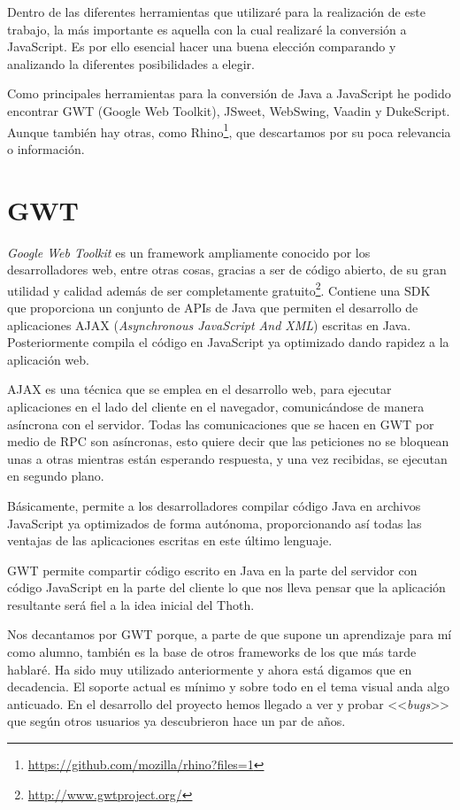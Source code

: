 
Dentro de las diferentes herramientas que utilizaré para la realización de este trabajo, la más importante es aquella con la cual realizaré la conversión a JavaScript. Es por ello esencial hacer una buena elección comparando y analizando la diferentes posibilidades a elegir.

Como principales herramientas para la conversión de Java a JavaScript he podido encontrar GWT (Google Web Toolkit), JSweet, WebSwing, Vaadin y DukeScript. Aunque también hay otras, como Rhino\footnote{\url{https://github.com/mozilla/rhino?files=1}}, que descartamos por su poca relevancia o información.

\section{GWT}

\emph{Google Web Toolkit} es un framework ampliamente conocido por los desarrolladores web, entre otras cosas, gracias a ser de código abierto, de su gran utilidad y calidad además de ser completamente gratuito\footnote{\url{http://www.gwtproject.org/}}.
Contiene una SDK que proporciona un conjunto de APIs de Java que permiten el desarrollo de aplicaciones AJAX (\emph{Asynchronous JavaScript And XML}) escritas en Java. Posteriormente compila el código en JavaScript ya optimizado dando rapidez a la aplicación web. 

AJAX es una técnica que se emplea en el desarrollo web, para ejecutar aplicaciones en el lado del cliente en el navegador, comunicándose de manera asíncrona con el servidor. Todas las comunicaciones que se hacen en GWT por medio de RPC son asíncronas, esto quiere decir que las peticiones no se bloquean unas a otras mientras están esperando respuesta, y una vez recibidas, se ejecutan en segundo plano.

Básicamente, permite a los desarrolladores compilar código Java en archivos JavaScript ya optimizados de forma autónoma, proporcionando así todas las ventajas de las aplicaciones escritas en este último lenguaje. 

GWT permite compartir código escrito en Java en la parte del servidor con código JavaScript en la parte del cliente lo que nos lleva pensar que la aplicación resultante será fiel a la idea inicial del Thoth. 

Nos decantamos por GWT porque, a parte de que supone un aprendizaje para mí como alumno, también es la base de otros frameworks de los que más tarde hablaré. Ha sido muy utilizado anteriormente y ahora está digamos que en decadencia. El soporte actual es mínimo y sobre todo en el tema visual anda algo anticuado. En el desarrollo del proyecto hemos llegado a ver  y probar <<\emph{bugs}>> que según otros usuarios ya descubrieron hace un par de años.

